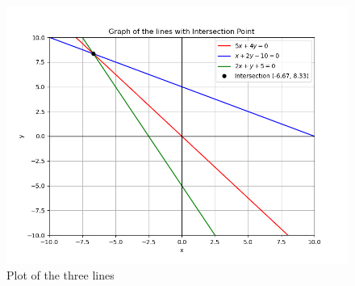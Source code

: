 \documentclass[journal]{IEEEtran}
\begin{document}
\begin{figure}[h!]
   \centering
   \includegraphics[width=\linewidth]{figs/01.png}
   \caption{Plot of the three lines}
   \label{Plot_1}
\end{figure}
\end{document}
